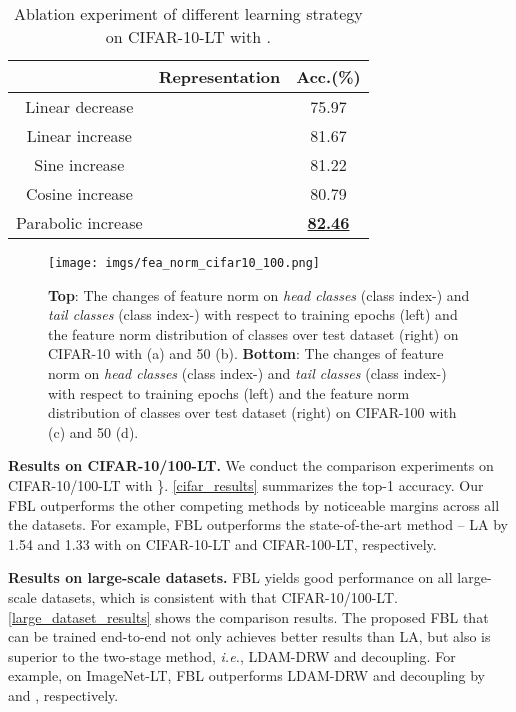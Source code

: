 \documentclass{article}
\def\ie{\emph{i.e.}} \def\Ie{\emph{I.e}\onedot}
\begin{document}
\begin{table}[t]
 \centering  \caption{Ablation experiment of different learning strategy on CIFAR-10-LT with .} \label{ab_rs}
\resizebox{0.38\textwidth}{!}
 {\begin{tabular}{c |c |c}  \toprule[0.6pt]
   & Representation & Acc.(\%)  \\
  \hline
  \hline
        Linear decrease &  & 75.97 \\
        Linear increase &  &  81.67 \\
        Sine increase   &  & 81.22 \\
        Cosine increase &  & 80.79 \\
        Parabolic increase &  & \underline{\textbf{82.46}} \\
  \bottomrule[0.6pt]
 \end{tabular}}
\vspace{-12pt}
\end{table}

\begin{figure*}[t]
	\centering
	\texttt{[image: imgs/fea\_norm\_cifar10\_100.png]}
	\vspace{-12pt}
	\caption{\textbf{Top}: The changes of feature norm on \emph{head classes} (class index-) and \emph{tail classes} (class index-) with respect to training epochs (left) and the feature norm distribution of classes over test dataset (right) on CIFAR-10 with  (a) and 50 (b). \textbf{Bottom}: The changes of feature norm on \emph{head classes} (class index-) and \emph{tail classes} (class index-) with respect to training epochs (left) and the feature norm distribution of classes over test dataset (right) on CIFAR-100 with  (c) and 50 (d).
	}
	\label{fig:vis}
	\vspace{-12pt}
\end{figure*}

\textbf{Results on CIFAR-10/100-LT.} We conduct the comparison experiments on CIFAR-10/100-LT with \}. \cref{cifar_results} summarizes the top-1 accuracy. Our FBL outperforms the other competing methods by noticeable margins across all the datasets. For example, FBL outperforms the state-of-the-art method -- LA by 1.54 and 1.33 with  on CIFAR-10-LT and CIFAR-100-LT, respectively.

\noindent\textbf{Results on large-scale datasets.}
FBL yields good performance on all large-scale datasets, which is consistent with that CIFAR-10/100-LT.  \cref{large_dataset_results} shows the comparison results. The proposed FBL that can be trained end-to-end not only achieves better results than LA, but also is superior to the two-stage method, \ie, LDAM-DRW and decoupling. For example, on ImageNet-LT, FBL outperforms LDAM-DRW and decoupling by  and , respectively.
\end{document}
